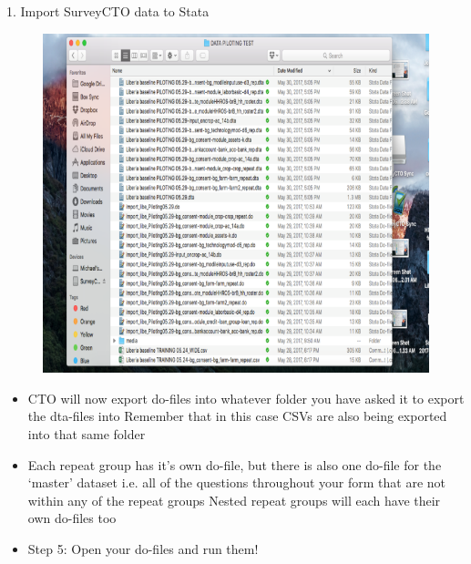 \documentclass[aspectratio=169]{beamer}
\begin{document}
\begin{frame}[fragile]{1. Import SurveyCTO data to Stata}
\begin{multicols}{2}	
	\begin{figure}
		\centering
		\includegraphics[width=\linewidth]{img/stata_dta}
	\end{figure}
	\begin{itemize}
		\item CTO will now export do-files into whatever folder you have asked it to export the dta-files into
		Remember that in this case CSVs are also being exported into that same folder
		\item Each repeat group has it’s own do-file, but there is also one do-file for the ‘master’ dataset i.e. all of the questions throughout your form that are not within any of the repeat groups
		Nested repeat groups will each have their own do-files too
		\item Step 5: Open your do-files and run them!		 
	\end{itemize}
\end{multicols}
\end{frame}
\end{document}
